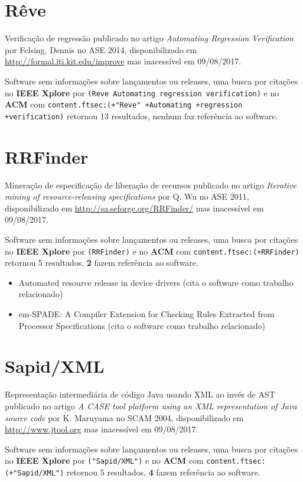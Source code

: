 \section{Rêve}

Verificação de regressão
publicado no artigo {\it Automating Regression Verification}
por Felsing, Dennis
no ASE 2014,
disponibilizado em \url{http://formal.iti.kit.edu/improve}
mas inacessível em 09/08/2017.

Software sem informações sobre lançamentos ou releases,
uma busca por citações no {\bf IEEE Xplore} por
\texttt{(Reve Automating regression verification)}
e no {\bf ACM} com
\texttt{content.ftsec:(+"Reve" +Automating +regression +verification)}
retornou
13 resultados,
nenhum faz referência ao software.


\section{RRFinder}

Mineração de especificação de liberação de recursos
publicado no artigo {\it Iterative mining of resource-releasing specifications}
por Q. Wu
no ASE 2011,
disponibilizado em \url{http://sa.seforge.org/RRFinder/}
mas inacessível em 09/08/2017.

Software sem informações sobre lançamentos ou releases,
uma busca por citações no {\bf IEEE Xplore} por
\texttt{(RRFinder)}
e no {\bf ACM} com
\texttt{content.ftsec:(+RRFinder)}
retornou
5 resultados,
{\bf 2} fazem referência ao software.

\begin{itemize}
\item Automated resource release in device drivers (cita o software como trabalho relacionado)
\item em-SPADE: A Compiler Extension for Checking Rules Extracted from Processor Specifications (cita o software como trabalho relacionado)
\end{itemize}

\section{Sapid/XML}

Representação intermediária de código Java usando XML ao invés de AST
publicado no artigo {\it A CASE tool platform using an XML representation of Java source code}
por K. Maruyama
no SCAM 2004,
disponibilizado em \url{http://www.jtool.org}
mas inacessível em 09/08/2017.

Software sem informações sobre lançamentos ou releases,
uma busca por citações no {\bf IEEE Xplore} por
\texttt{("Sapid/XML")}
e no {\bf ACM} com
\texttt{content.ftsec:(+"Sapid/XML")}
retornou
5 resultados,
{\bf 4} fazem referência ao software.

